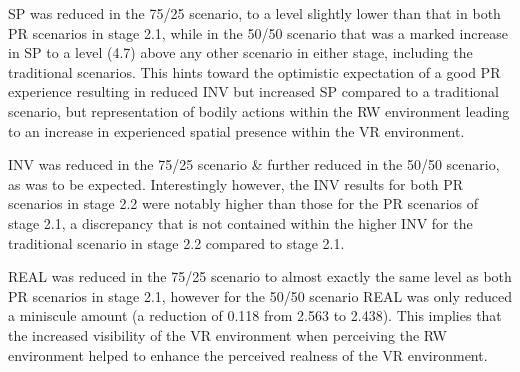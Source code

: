 SP was reduced in the 75/25 scenario, to a level slightly lower than that in both PR scenarios in stage 2.1, while in the 50/50 scenario that was a marked increase in SP to a level (4.7) above any other scenario in either stage, including the traditional scenarios. This hints toward the optimistic expectation of a good PR experience resulting in reduced INV but increased SP compared to a traditional scenario, but representation of bodily actions within the RW environment leading to an increase in experienced spatial presence within the VR environment.

INV was reduced in the 75/25 scenario \& further reduced in the 50/50 scenario, as was to be expected. Interestingly however, the INV results for both PR scenarios in stage 2.2 were notably higher than those for the PR scenarios of stage 2.1, a discrepancy that is not contained within the higher INV for the traditional scenario in stage 2.2 compared to stage 2.1.

REAL was reduced in the 75/25 scenario to almost exactly the same level as both PR scenarios in stage 2.1, however for the 50/50 scenario REAL was only reduced a miniscule amount (a reduction of 0.118 from 2.563 to 2.438). This implies that the increased visibility of the VR environment when perceiving the RW environment helped to enhance the perceived realness of the VR environment.

